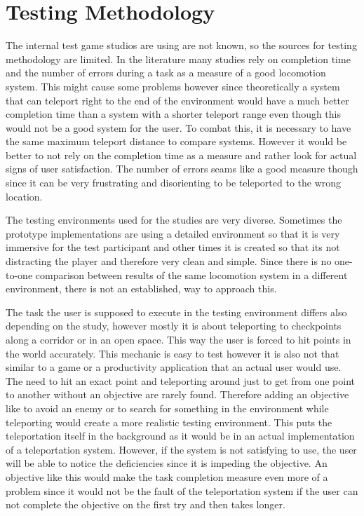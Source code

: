 \section{Testing Methodology}
The internal test game studios are using are not known, so the sources for testing methodology are limited. In the literature many studies rely on completion time and the number of errors during a task as a measure of a good locomotion system. %
This might cause some problems however since theoretically a system that can teleport right to the end of the environment would have a much better completion time than a system with a shorter teleport range even though this would not be a good system for the user. To combat this, it is necessary to have the same maximum teleport distance to compare systems. However it would be better to not rely on the completion time as a measure and rather look for actual signs of user satisfaction. The number of errors seams like a good measure though since it can be very frustrating and disorienting to be teleported to the wrong location. 

The testing environments used for the studies are very diverse. Sometimes the prototype implementations are using a detailed environment so that it is very immersive for the test participant and other times it is created so that its not distracting the player and therefore very clean and simple. %
Since there is no one-to-one comparison between results of the same locomotion system in a different environment, there is not an established, way to approach this.

The task the user is supposed to execute in the testing environment differs also depending on the study, however mostly it is about teleporting to checkpoints along a corridor or in an open space. %
This way the user is forced to hit points in the world accurately. This mechanic is easy to test however it is also not that similar to a game or a productivity application that an actual user would use. The need to hit an exact point and teleporting around just to get from one point to another without an objective are rarely found. Therefore adding an objective like to avoid an enemy or to search for something in the environment while teleporting would create a more realistic testing environment. This puts the teleportation itself in the background as it would be in an actual implementation of a teleportation system. However, if the system is not satisfying to use, the user will be able to notice the deficiencies since it is impeding the objective. An objective like this would make the task completion measure even more of a problem since it would not be the fault of the teleportation system if the user can not complete the objective on the first try and then takes longer. 

